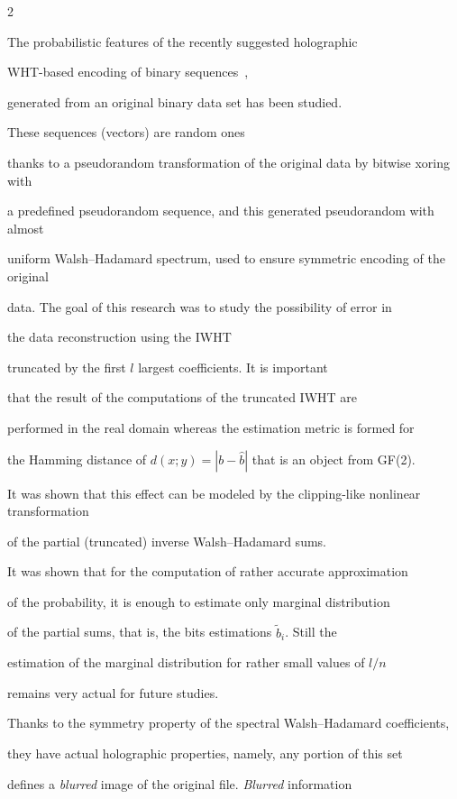 \begin{multicols}{2}
\noindent

The probabilistic features of the recently suggested holographic 

WHT-based encoding of binary sequences~\cite{2-fr, 8-fr}, 

generated from an original binary data set has been studied. 

These sequences (vectors) are random ones 

thanks to a pseudorandom transformation of the original data by bitwise xoring with 

a predefined pseudorandom sequence, and this generated  pseudorandom with almost 

uniform Walsh--Hadamard spectrum, used to ensure symmetric encoding of the original 

data. The goal of this research was to study the possibility of error in

the data reconstruction using the IWHT

truncated by the first $l$ largest coefficients. It is important 

that the result of the computations of the  truncated IWHT are

performed in the real domain whereas the estimation metric is formed for 

the Hamming distance of $d(x; y) =| b-\hat b | $ that is an object from GF(2).



It was shown that this effect can be modeled by the clipping-like nonlinear transformation 

of the partial (truncated) inverse Walsh--Hadamard sums.

It was shown that for the computation of rather accurate approximation 

of the probability, it is enough to estimate only marginal distribution 

of the partial sums, that is, the bits estimations $\tilde b_i$. Still the 

estimation of the marginal distribution for rather small values of $l/n$ 

remains very actual for future studies.

Thanks to the symmetry property of the spectral Walsh--Hadamard coefficients, 

they have actual holographic properties, namely, any portion of this set

defines a {\em blurred} image of the original file. {\em Blurred} information 


\end{multicols}
